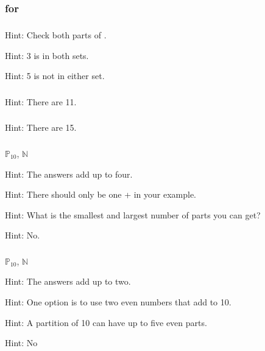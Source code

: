 \subsection{\answers}

\subsubsection{\answers for \subdefnpartition}

\subsubsection*{ \answers}
\begin{apart}
    \item Hint: Check both parts of .
    \item Hint: 3 is in both sets.
    \item Hint: 5 is not in either set.
\end{apart}

\subsubsection*{ \answers}
Hint: There are 11.

\subsubsection*{ \answers}
Hint: There are 15.

\subsubsection*{ \answers}
\begin{apart}
    \item $\mathbb{P}_{10}$, $\mathbb{N}$
    \item Hint: The answers add up to four.
    \item Hint: There should only be one + in your example.
    \item Hint: What is the smallest and largest number of parts you can get?
    \item Hint: No.
\end{apart}

\subsubsection*{ \answers}
\begin{apart}
    \item $\mathbb{P}_{10}$, $\mathbb{N}$
    \item Hint: The answers add up to two.
    \item Hint: One option is to use two even numbers that add to 10.
    \item Hint: A partition of 10 can have up to five even parts.  
    \item Hint: No
\end{apart}

